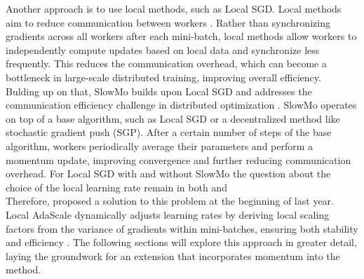 \documentclass[10pt,twocolumn,letterpaper]{article}
\begin{document}
Another approach is to use local methods, such as Local SGD. Local methods aim to reduce communication between workers \cite{lin2020dontuselargeminibatches}. Rather than synchronizing gradients across all workers after each mini-batch, local methods allow workers to independently compute updates based on local data and synchronize less frequently. This reduces the communication overhead, which can become a bottleneck in large-scale distributed training, improving overall efficiency.\\

Bulding up on that, SlowMo builds upon Local SGD and addresses the communication efficiency challenge in distributed optimization \cite{wang2020slowmoimprovingcommunicationefficientdistributed}. SlowMo operates on top of a base algorithm, such as Local SGD or a decentralized method like stochastic gradient push (SGP). After a certain number of steps of the base algorithm, workers periodically average their parameters and perform a momentum update, improving convergence and further reducing communication overhead. For Local SGD with and without SlowMo the question about the choice of the local learning rate remain in both \cite{lin2020dontuselargeminibatches} and \cite{wang2020slowmoimprovingcommunicationefficientdistributed}\\

Therefore, \cite{BALLES2024P} proposed a solution to this problem at the beginning of last year. Local AdaScale dynamically adjusts learning rates by deriving local scaling factors from the variance of gradients within mini-batches, ensuring both stability and efficiency \cite{BALLES2024P}. The following sections will explore this approach in greater detail, laying the groundwork for an extension that incorporates momentum into the method.

\end{document}
